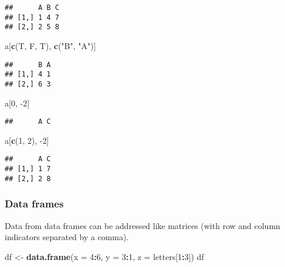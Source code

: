 \documentclass[
]{book}
\newenvironment{Shaded}{\begin{snugshade}}{\end{snugshade}}
\newcommand{\DataTypeTok}[1]{\textcolor[rgb]{0.13,0.29,0.53}{#1}}
\newcommand{\DecValTok}[1]{\textcolor[rgb]{0.00,0.00,0.81}{#1}}
\newcommand{\KeywordTok}[1]{\textcolor[rgb]{0.13,0.29,0.53}{\textbf{#1}}}
\newcommand{\NormalTok}[1]{#1}
\newcommand{\OperatorTok}[1]{\textcolor[rgb]{0.81,0.36,0.00}{\textbf{#1}}}
\newcommand{\StringTok}[1]{\textcolor[rgb]{0.31,0.60,0.02}{#1}}
\begin{document}
\begin{verbatim}
##      A B C
## [1,] 1 4 7
## [2,] 2 5 8
\end{verbatim}

\begin{Shaded}
\begin{Highlighting}[]
\NormalTok{a[}\KeywordTok{c}\NormalTok{(T, F, T), }\KeywordTok{c}\NormalTok{(}\StringTok{"B"}\NormalTok{, }\StringTok{"A"}\NormalTok{)]}
\end{Highlighting}
\end{Shaded}

\begin{verbatim}
##      B A
## [1,] 4 1
## [2,] 6 3
\end{verbatim}

\begin{Shaded}
\begin{Highlighting}[]
\NormalTok{a[}\DecValTok{0}\NormalTok{, }\DecValTok{{-}2}\NormalTok{]}
\end{Highlighting}
\end{Shaded}

\begin{verbatim}
##      A C
\end{verbatim}

\begin{Shaded}
\begin{Highlighting}[]
\NormalTok{a[}\KeywordTok{c}\NormalTok{(}\DecValTok{1}\NormalTok{, }\DecValTok{2}\NormalTok{), }\DecValTok{{-}2}\NormalTok{]}
\end{Highlighting}
\end{Shaded}

\begin{verbatim}
##      A C
## [1,] 1 7
## [2,] 2 8
\end{verbatim}

\hypertarget{data-frames}{%
\subsubsection{Data frames}\label{data-frames}}

Data from data frames can be addressed like matrices (with row and column indicators separated by a comma).

\begin{Shaded}
\begin{Highlighting}[]
\NormalTok{df \textless{}{-}}\StringTok{ }\KeywordTok{data.frame}\NormalTok{(}\DataTypeTok{x =} \DecValTok{4}\OperatorTok{:}\DecValTok{6}\NormalTok{, }\DataTypeTok{y =} \DecValTok{3}\OperatorTok{:}\DecValTok{1}\NormalTok{, }\DataTypeTok{z =}\NormalTok{ letters[}\DecValTok{1}\OperatorTok{:}\DecValTok{3}\NormalTok{])}
\NormalTok{df}
\end{Highlighting}
\end{Shaded}
\end{document}
